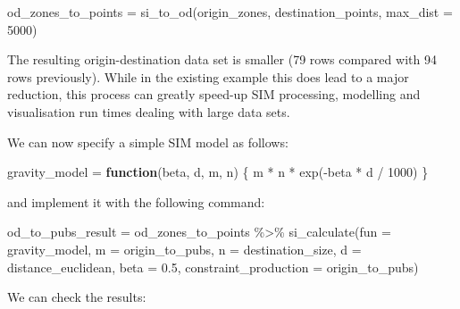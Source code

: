 \documentclass[11pt,letterpaper]{article}
\newenvironment{Shaded}{\begin{snugshade}}{\end{snugshade}}
\newcommand{\AttributeTok}[1]{\textcolor[rgb]{0.77,0.63,0.00}{#1}}
\newcommand{\CommentTok}[1]{\textcolor[rgb]{0.56,0.35,0.01}{\textit{#1}}}
\newcommand{\ControlFlowTok}[1]{\textcolor[rgb]{0.13,0.29,0.53}{\textbf{#1}}}
\newcommand{\DecValTok}[1]{\textcolor[rgb]{0.00,0.00,0.81}{#1}}
\newcommand{\FloatTok}[1]{\textcolor[rgb]{0.00,0.00,0.81}{#1}}
\newcommand{\FunctionTok}[1]{\textcolor[rgb]{0.00,0.00,0.00}{#1}}
\newcommand{\NormalTok}[1]{#1}
\newcommand{\OtherTok}[1]{\textcolor[rgb]{0.56,0.35,0.01}{#1}}
\newcommand{\SpecialCharTok}[1]{\textcolor[rgb]{0.00,0.00,0.00}{#1}}
\begin{document}
\begin{Shaded}
\begin{Highlighting}[]
\NormalTok{od\_zones\_to\_points }\OtherTok{=} \FunctionTok{si\_to\_od}\NormalTok{(origin\_zones, }
\NormalTok{                              destination\_points, }
                              \AttributeTok{max\_dist =} \DecValTok{5000}\NormalTok{)}
\end{Highlighting}
\end{Shaded}

The resulting origin-destination data set is smaller (79 rows compared with 94 rows previously).
While in the existing example this does lead to a major reduction, this process can greatly speed-up SIM processing, modelling and visualisation run times dealing with large data sets.

We can now specify a simple SIM model as follows:

\begin{Shaded}
\begin{Highlighting}[]
\NormalTok{gravity\_model }\OtherTok{=} \ControlFlowTok{function}\NormalTok{(beta, d, m, n) \{}
\NormalTok{  m }\SpecialCharTok{*}\NormalTok{ n }\SpecialCharTok{*} \FunctionTok{exp}\NormalTok{(}\SpecialCharTok{{-}}\NormalTok{beta }\SpecialCharTok{*}\NormalTok{ d }\SpecialCharTok{/} \DecValTok{1000}\NormalTok{)}
\NormalTok{\} }
\end{Highlighting}
\end{Shaded}

and implement it with the following command:

\begin{Shaded}
\begin{Highlighting}[]
\NormalTok{od\_to\_pubs\_result }\OtherTok{=}\NormalTok{ od\_zones\_to\_points }\SpecialCharTok{\%\textgreater{}\%} 
  \FunctionTok{si\_calculate}\NormalTok{(}\AttributeTok{fun =}\NormalTok{ gravity\_model, }
               \AttributeTok{m =}\NormalTok{ origin\_to\_pubs,}
               \AttributeTok{n =}\NormalTok{ destination\_size,}
               \AttributeTok{d =}\NormalTok{ distance\_euclidean,}
               \AttributeTok{beta =} \FloatTok{0.5}\NormalTok{,}
               \AttributeTok{constraint\_production =}\NormalTok{ origin\_to\_pubs)}
\end{Highlighting}
\end{Shaded}

We can check the results:

\begin{Shaded}
\end{Shaded}
\end{document}
